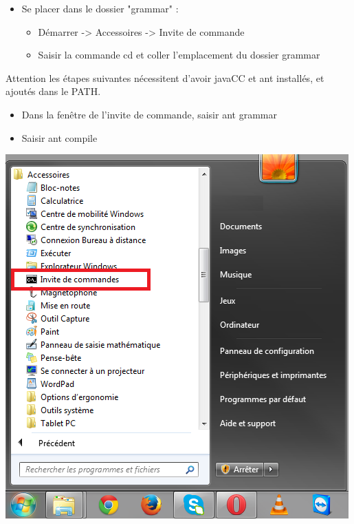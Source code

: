 \documentclass[a4paper,11pt]{article}
\begin{document}
        \begin{itemize}
            \item Se placer dans le dossier "grammar" :	
            \begin{itemize}
                            \item Démarrer -> Accessoires -> Invite de commande
                            \item Saisir la commande cd et coller l'emplacement du dossier grammar 
            \end{itemize}
        \end{itemize}

        Attention les étapes suivantes nécessitent d'avoir javaCC et ant installés, et ajoutés dans le PATH.

        \begin{itemize}
            \item Dans la fenêtre de l'invite de commande, saisir ant grammar
            \item Saisir ant compile
        \end{itemize}
                
        \begin{center}
            \includegraphics[scale=0.75]{img/cmd.png}
        \end{center}
\end{document}
